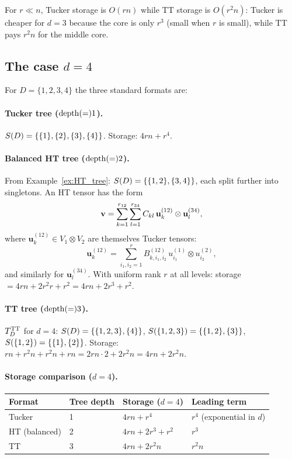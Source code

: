 For $r \ll n$, Tucker storage is $O(rn)$ while TT storage is $O(r^2 n)$:
Tucker is cheaper for $d=3$ because the core is only $r^3$ (small
when $r$ is small), while TT pays $r^2 n$ for the middle core.

\subsection*{The case $d=4$}

For $D = \{1,2,3,4\}$ the three standard formats are:

\paragraph{Tucker tree ($\mathrm{depth}(=) 1$).}
$S(D) = \{\{1\},\{2\},\{3\},\{4\}\}$.
Storage: $4rn + r^4$.

\paragraph{Balanced HT tree ($\mathrm{depth}(=) 2$).}
From Example~\ref{ex:HT_tree}:
$S(D) = \{\{1,2\},\{3,4\}\}$, each split further into singletons.
An HT tensor has the form
\begin{equation*}
    \mathbf{v} = \sum_{k=1}^{r_{12}} \sum_{l=1}^{r_{34}}
    C_{kl}\, \mathbf{u}^{(12)}_k \otimes \mathbf{u}^{(34)}_l,
\end{equation*}
where $\mathbf{u}^{(12)}_k \in V_1 \otimes V_2$ are themselves Tucker
tensors:
\begin{equation*}
    \mathbf{u}^{(12)}_k
    = \sum_{i_1,i_2=1}^{r}
    B^{(12)}_{k, i_1, i_2}\, u^{(1)}_{i_1} \otimes u^{(2)}_{i_2},
\end{equation*}
and similarly for $\mathbf{u}^{(34)}_l$.
With uniform rank $r$ at all levels:
storage $= 4rn + 2r^2 r + r^2 = 4rn + 2r^3 + r^2$.

\paragraph{TT tree ($\mathrm{depth}(=) 3$).}
$T_D^{\mathrm{TT}}$ for $d=4$: $S(D) = \{\{1,2,3\},\{4\}\}$,
$S(\{1,2,3\}) = \{\{1,2\},\{3\}\}$,
$S(\{1,2\}) = \{\{1\},\{2\}\}$.
Storage: $rn + r^2 n + r^2 n + rn = 2rn \cdot 2 + 2r^2 n = 4rn + 2r^2 n$.

\paragraph{Storage comparison ($d=4$).}
\begin{center}
\renewcommand{\arraystretch}{1.3}
\begin{tabular}{@{}llll@{}}
\toprule
Format & Tree depth & Storage ($d=4$) & Leading term \\
\midrule
Tucker & 1 & $4rn + r^4$ & $r^4$ (exponential in $d$) \\
HT (balanced) & 2 & $4rn + 2r^3 + r^2$ & $r^3$ \\
TT & 3 & $4rn + 2r^2 n$ & $r^2 n$ \\
\bottomrule
\end{tabular}
\end{center}

